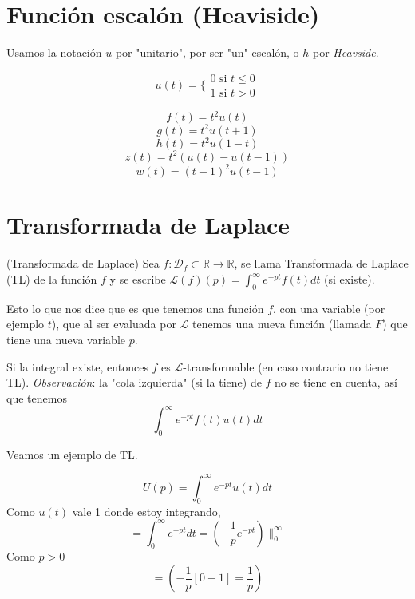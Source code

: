 \section{Funci\'on escal\'on (Heaviside)}

Usamos la notaci\'on $u$ por "unitario", por ser "un" escal\'on, o $h$ por \emph{Heavside}.


$$
u(t) = \lbrace{ \begin{matrix}
0 \textrm{ si } t \leq 0 \\
1 \textrm{ si } t > 0
\end{matrix} }
$$


$$f(t) = t^2u(t)$$
$$g(t) = t^2u(t+1)$$
$$h(t) = t^2u(1-t)$$
$$z(t) = t^2(u(t) - u(t-1))$$ %
$$w(t) = (t-1)^2 u(t-1)$$ 

\section{Transformada de Laplace}

\begin{definition}
(Transformada de Laplace) Sea $f: \mathcal{D}_f \subset \mathbb{R} \rightarrow \mathbb{R}$, se llama Transformada de Laplace (TL) de la funci\'on $f$ y se escribe $\mathcal{L}(f)(p) = \int_{0}^{\infty}e^{-pt}f(t)dt$ (si existe).
\end{definition}

Esto lo que nos dice que es que tenemos una funci\'on $f$, con una variable (por ejemplo $t$), que al ser evaluada por $\mathcal{L}$ tenemos una nueva funci\'on (llamada $F$) que tiene una nueva variable $p$.


Si la integral existe, entonces $f$ es $\mathcal{L}$-transformable (en caso contrario no tiene TL).
\emph{Observaci\'on}: la "cola izquierda" (si la tiene) de $f$ no se tiene en cuenta, as\'i que tenemos
$$
\int_{0}^{\infty}e^{-pt}f(t)u(t)dt
$$

Veamos un ejemplo de TL.

$$
U(p) = \int_0^{\infty}e^{-pt}u(t)dt
$$
Como $u(t)$ vale 1 donde estoy integrando,
$$
= \int_0^{\infty}e^{-pt}dt = (-\frac{1}{p}e^{-pt})\|^{\infty}_0
$$
Como $p > 0$
$$
= (-\frac{1}{p}\left[0 - 1\right] = \frac{1}{p})
$$

